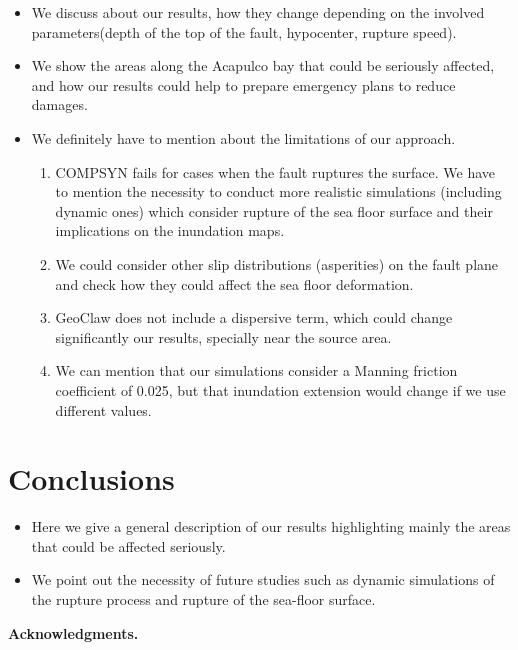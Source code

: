 \documentclass[preprint,review,12pt]{elsarticle}
\begin{document}
\begin{itemize}
  \item We discuss about our results, how they change depending on the involved parameters(depth of the top of the fault, hypocenter, rupture speed).
  \item We show the areas along the Acapulco bay that could be seriously affected, and how our results could help to prepare emergency plans to reduce damages. 
  \item We definitely have to mention about the limitations of our approach. 

  \begin{enumerate}
   \item COMPSYN fails for cases when the fault ruptures  the surface. We have to mention the necessity to conduct more realistic simulations (including dynamic ones) which consider rupture of the sea floor surface and their implications on the inundation maps. 
   \item We could consider other slip distributions (asperities) on the fault plane and check how they could affect the sea floor deformation.
   \item GeoClaw does not include a dispersive term, which could change significantly our results, specially near the source area.
   \item We can mention that our simulations consider a Manning friction coefficient of 0.025, but that inundation extension would change if we use different values.
  \end{enumerate}

\end{itemize}
  
\section{Conclusions}

\begin{itemize}
\item Here we give a general description of our results highlighting mainly the areas that could be affected seriously. 
  \item We point out the necessity of future studies such as dynamic simulations of the rupture process and rupture of the sea-floor surface.
\end{itemize}

\vskip 10pt
{\bf Acknowledgments.}




\end{document}
